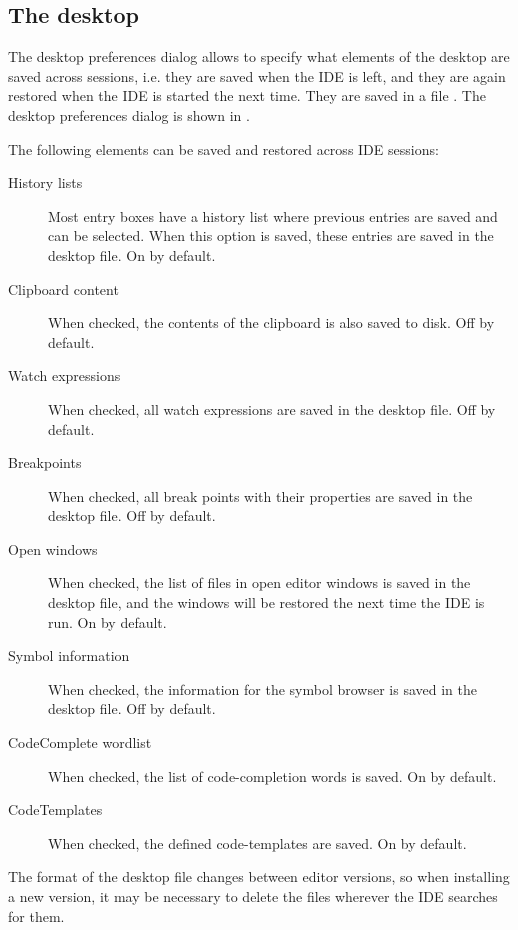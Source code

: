 \subsection{The desktop}
\label{se:prefdesktop}
The desktop preferences dialog allows to specify what elements of the
desktop are saved across sessions, i.e. they are saved when the IDE is left,
and they are again restored when the IDE is started the next time. 
They are saved in a file .
The desktop preferences dialog is shown in .


The following elements can be saved and restored across IDE sessions:
\begin{description}
\item[History lists] Most entry boxes have a history list where previous
entries are saved and can be selected. When this option is saved, these
entries are saved in the desktop file. On by default.
\item[Clipboard content]
When checked, the contents of the clipboard is also saved to disk. Off by
default.
\item[Watch expressions]
When checked, all watch expressions are saved in the desktop file. Off by
default.
\item[Breakpoints] 
When checked, all break points with their properties are saved in the
desktop file. Off by default.
\item[Open windows]
When checked, the list of files in open editor windows is saved in the 
desktop file, and the windows will be restored the next time the IDE 
is run. On by default.
\item[Symbol information]
When checked, the information for the symbol browser is saved in the desktop
file. Off by default.
\item[CodeComplete wordlist]
When checked, the list of code-completion words is saved. On by default.
\item[CodeTemplates]
When checked, the defined code-templates are saved. On by default.
\end{description}

\begin{remark}
The format of the desktop file changes between editor versions, so
when installing a new version, it may be necessary to delete the
 files wherever the IDE searches for them.
\end{remark}

%
%

